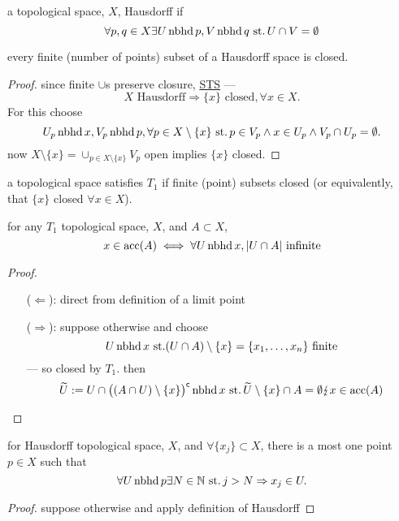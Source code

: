 \begin{defn}
  a topological space, $X$, Hausdorff if
  \[ \forall p,q \in X \exists U\operatorname{nbhd} p, V\operatorname{nbhd} q
  \operatorname{\,st.} U\cap V=\emptyset \]
\end{defn}

\begin{thm}\label{thm:17.8}
  every finite (number of points) subset
  of a Hausdorff space is closed.
\end{thm}
\begin{proof}
  since finite $\cup$s preserve closure, \underline{STS} ---
  \[ X\text{ Hausdorff}\Rightarrow
  \{x\}\text{ closed},\forall x\in X. \]
  For this choose
  \[U_p\operatorname{nbhd} x, V_p\operatorname{nbhd} p,\forall p\in X\setminus\{x\}
  \operatorname{\,st.} p\in V_p\land x\in U_p\land V_p\cap U_p =\emptyset.\]
  now $X\setminus\{x\}=\cup_{p\in X\setminus\{x\}} V_p$ open
  implies $\{x\}$ closed.
\end{proof}

\begin{defn}
  a topological space satisfies \emph{$T_1$}
  if finite (point) subsets closed
  (or equivalently, that $\{x\}$ closed $\forall x\in X$).
\end{defn}

\begin{thm}\label{thm:17.9}
  for any $T_1$ topological space, $X$, and $A\subset X$,
  \[ x\in\operatorname{acc}(A) \iff \forall U\operatorname{nbhd} x, |U\cap A|\text{ infinite} \]
\end{thm}
\begin{proof}
  \begin{itemize}
  \item[($\Leftarrow$):] direct from definition of a limit point
  \item[($\Rightarrow$):]
    suppose otherwise and choose
    \[ U\operatorname{nbhd} x \operatorname{\,st.} (U\cap A)\setminus\{x\} =
    \{x_1,\ldots, x_n\}\text{ finite} \]
    --- so closed by $T_1$.
    then
    \[
    \widetilde{U} :=
    U\cap{\big((A\cap U)\setminus\{x\}\big)}^{\mathsf{c}} \operatorname{nbhd} x
    \operatorname{\,st.} \widetilde{U}\setminus\{x\}\cap A=\emptyset
    \lightning x\in\operatorname{acc}(A)
    \]
  \end{itemize}
\end{proof}

\begin{thm}\label{thm:17.10}
  for Hausdorff topological space, $X$, and $\forall \{x_j\}\subset X$,
  there is a most one point $p\in X$ such that
  \[
  \forall U\operatorname{nbhd} p \exists N\in\mathbb N
  \operatorname{\,st.} j>N\Rightarrow x_j\in U.
  \]
\end{thm}
\begin{proof}
  suppose otherwise and apply definition of Hausdorff
\end{proof}

